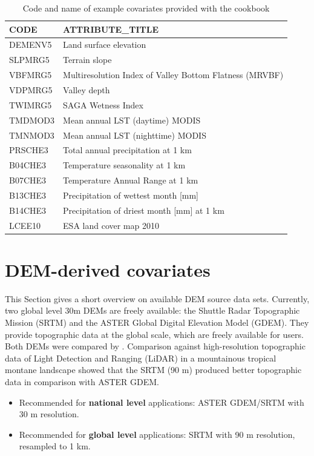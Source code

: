 \documentclass[10pt,b5paper,]{book}
\providecommand{\tightlist}{%
  \setlength{\itemsep}{0pt}\setlength{\parskip}{0pt}}
\theoremstyle{definition}
\theoremstyle{definition}
\theoremstyle{definition}
\theoremstyle{remark}
\begin{document}
\begin{table}

\caption{\label{tab:covariates}Code and name of example covariates provided with the cookbook}
\centering
\begin{tabular}[t]{ll}
\toprule
CODE & ATTRIBUTE\_TITLE\\
\midrule
DEMENV5 & Land surface elevation\\
SLPMRG5 & Terrain slope\\
VBFMRG5 & Multiresolution Index of Valley Bottom Flatness (MRVBF)\\
VDPMRG5 & Valley depth\\
TWIMRG5 & SAGA Wetness Index\\
\addlinespace
TMDMOD3 & Mean annual LST (daytime) MODIS\\
TMNMOD3 & Mean annual LST (nighttime) MODIS\\
PRSCHE3 & Total annual precipitation at 1 km\\
B04CHE3 & Temperature seasonality at 1 km\\
B07CHE3 & Temperature Annual Range at 1 km\\
\addlinespace
B13CHE3 & Precipitation of wettest month [mm]\\
B14CHE3 & Precipitation of driest month [mm] at 1 km\\
LCEE10 & ESA land cover map 2010\\
\bottomrule
\end{tabular}
\end{table}

\hypertarget{dem-derived-covariates}{%
\section{DEM-derived covariates}\label{dem-derived-covariates}}

This Section gives a short overview on available DEM source data sets.
Currently, two global level 30m DEMs are freely available: the Shuttle
Radar Topographic Mission (SRTM) and the ASTER Global Digital Elevation
Model (GDEM). They provide topographic data at the global scale, which
are freely available for users. Both DEMs were compared by
\citet{Wong2014}. Comparison against high-resolution topographic data of
Light Detection and Ranging (LiDAR) in a mountainous tropical montane
landscape showed that the SRTM (90 m) produced better topographic data
in comparison with ASTER GDEM.

\begin{itemize}
\tightlist
\item
  Recommended for \textbf{national level} applications: ASTER GDEM/SRTM
  with 30 m resolution.
\item
  Recommended for \textbf{global level} applications: SRTM with 90 m
  resolution, resampled to 1 km.
\end{itemize}
\end{document}
